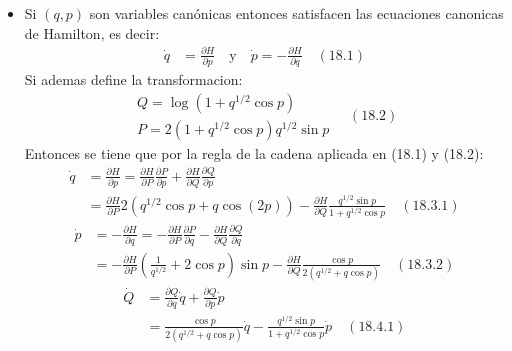 \documentclass[a4paper]{article}
\begin{document}
    \begin{answer}[Punto 4]
        \begin{itemize}
            \item Si $(q,p)$ son variables canónicas entonces satisfacen las ecuaciones canonicas de Hamilton, es decir:
            \begin{align*}
                \dot q &= \frac{\partial H}{\partial p} \quad \text{y} \quad \dot p = -\frac{\partial H}{\partial q} \quad (18.1)
            \end{align*}
            Si ademas define la transformacion:
            \begin{equation*}
                \begin{gathered}
                    Q=\log \left(1+q^{1 / 2} \cos p\right) \\
                    P=2\left(1+q^{1 / 2} \cos p\right) q^{1 / 2} \sin p
                \end{gathered}    \quad (18.2)
            \end{equation*}
            Entonces se tiene que por la regla de la cadena aplicada en (18.1) y (18.2):
            \begin{align*}
                \dot q &= \frac{\partial H}{\partial p} = \frac{\partial H}{\partial P} \frac{\partial P}{\partial p} + \frac{\partial H}{\partial Q} \frac{\partial Q}{\partial p}\\
                &= \frac{\partial H}{\partial P} 2 \left( q^{1/2} \cos p + q \cos (2p) \right) - \frac{\partial H}{\partial Q} \frac{q^{1/2} \sin p}{1 + q^{1/2} \cos p} \quad (18.3.1)
            \end{align*}
            \begin{align*}
                \dot p &= - \frac {\partial H}{\partial q} = -\frac{\partial H}{\partial P} \frac{\partial P}{\partial q} - \frac{\partial H}{\partial Q} \frac{\partial Q}{\partial q}\\
                &= -\frac{\partial H}{\partial P} \left(\frac1{q^{1/2}} + 2\cos p\right)\sin p - \frac{\partial H}{\partial Q} \frac{\cos p}{2(q^{1/2}  + q \cos p)} \quad (18.3.2)
            \end{align*}
            \begin{align*}
                \dot Q &= \frac{\partial Q}{\partial q} \dot q + \frac{\partial Q}{\partial p} \dot p\\
                &= \frac{\cos p}{2(q^{1/2}  + q \cos p)} \dot q - \frac{q^{1/2} \sin p}{1 + q^{1/2} \cos p} \dot p \quad (18.4.1)
            \end{align*}

\end{itemize}
\end{answer}
\end{document}
